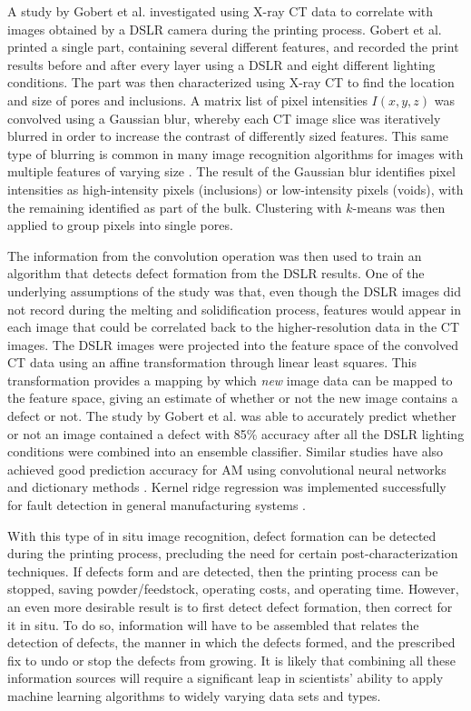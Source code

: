 A study by Gobert et al. investigated using X-ray CT data to correlate with images obtained by a DSLR camera during the printing process. Gobert et al. printed a single part, containing several different features, and recorded the print results before and after every layer using a DSLR and eight different lighting conditions. The part was then characterized using X-ray CT to find the location and size of pores and inclusions. A matrix list of pixel intensities $I(x,y,z)$ was convolved using a Gaussian blur, whereby each CT image slice was iteratively blurred in order to increase the contrast of differently sized features. This same type of blurring is common in many image recognition algorithms for images with multiple features of varying size \cite{Lowe2004, Bay2008}. The result of the Gaussian blur identifies pixel intensities as high-intensity pixels (inclusions) or low-intensity pixels (voids), with the remaining identified as part of the bulk. Clustering with $k$-means was then applied to group pixels into single pores.

The information from the convolution operation was then used to train an algorithm that detects defect formation from the DSLR results. One of the underlying assumptions of the study was that, even though the DSLR images did not record during the melting and solidification process, features would appear in each image that could be correlated back to the higher-resolution data in the CT images. The DSLR images were projected into the feature space of the convolved CT data using an affine transformation through linear least squares. This transformation provides a mapping by which \textit{new} image data can be mapped to the feature space, giving an estimate of whether or not the new image contains a defect or not. The study by Gobert et al. was able to accurately predict whether or not an image contained a defect with 85\% accuracy after all the DSLR lighting conditions were combined into an ensemble classifier. Similar studies have also achieved good prediction accuracy for AM using convolutional neural networks \cite{Scime2018} and dictionary methods \cite{Abdelrahman2017}. Kernel ridge regression was implemented successfully for fault detection in general manufacturing systems \cite{Wang2018}.

With this type of in situ image recognition, defect formation can be detected during the printing process, precluding the need for certain post-characterization techniques. If defects form and are detected, then the printing process can be stopped, saving powder/feedstock, operating costs, and operating time. However, an even more desirable result is to first detect defect formation, then correct for it in situ. To do so, information will have to be assembled that relates the detection of defects, the manner in which the defects formed, and the prescribed fix to undo or stop the defects from growing. It is likely that combining all these information sources will require a significant leap in scientists' ability to apply machine learning algorithms to widely varying data sets and types. \newline 

